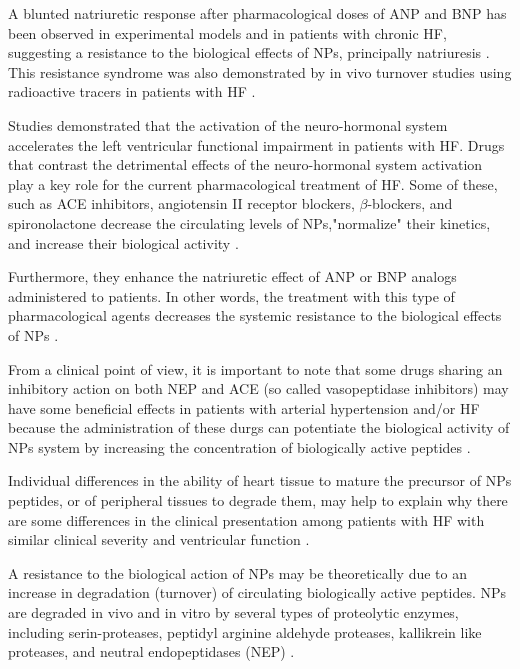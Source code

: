 \documentclass[14pt,a4paper,onecolumn]{extarticle}
\begin{document}
A blunted natriuretic response after pharmacological doses of ANP and BNP has been observed in experimental models and in patients with chronic HF, suggesting a resistance to the biological effects of NPs, principally natriuresis \citep{bib325} \citep{bib333} \citep{bib331}. This resistance syndrome was also demonstrated by in vivo turnover studies using radioactive tracers in patients with HF \citep{bib333}. %

Studies demonstrated that the activation of the neuro-hormonal system accelerates the left ventricular functional impairment in patients with HF. Drugs that contrast the detrimental effects of the neuro-hormonal system activation play a key role for the current pharmacological treatment of HF. Some of these, such as ACE inhibitors, angiotensin II receptor blockers, $\beta$-blockers, and spironolactone decrease the circulating levels of NPs,"normalize" their kinetics, and increase their biological activity \citep{bib35}.

Furthermore, they enhance the natriuretic effect of ANP or BNP analogs administered to patients. In other words, the treatment with this type of pharmacological agents decreases the systemic resistance to the biological effects of NPs \citep{bib333}. %

From a clinical point of view, it is important to note that some drugs sharing an inhibitory action on both NEP and ACE (so called vasopeptidase inhibitors) may have some beneficial effects in patients with arterial hypertension and/or HF because the administration of these durgs can potentiate the biological activity of NPs system by increasing the concentration of biologically active peptides \citep{bib340} \citep{bib341} \citep{bib342}. %

Individual differences in the ability of heart tissue to mature the precursor of NPs peptides, or of peripheral tissues to degrade them, may help to explain why there are some differences in the clinical presentation among patients with HF with similar clinical severity and ventricular function \citep{bib36}. %

A resistance to the biological action of NPs may be theoretically due to an increase in degradation (turnover) of circulating biologically active peptides. NPs are degraded in vivo and in vitro by several types of proteolytic enzymes, including serin-proteases, peptidyl arginine aldehyde proteases, kallikrein like proteases, and neutral endopeptidases (NEP) \citep{bib335}. %
\end{document}
